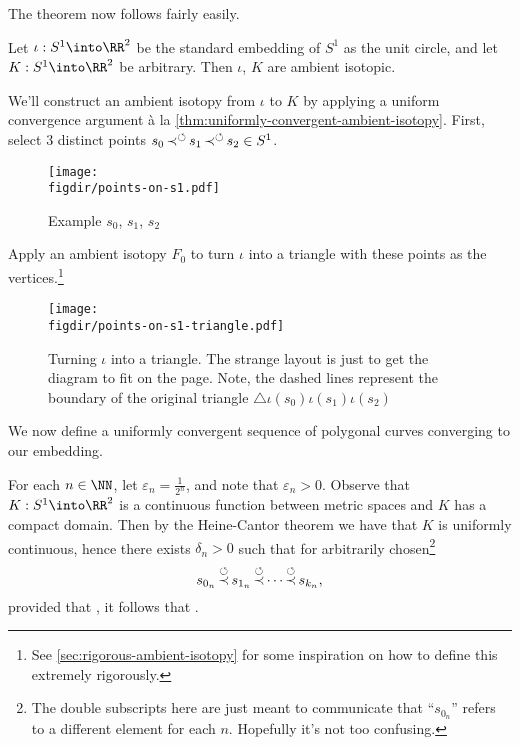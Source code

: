 The theorem now follows fairly easily.
\begin{theorem}\label{thm:all-ambient-isotopic-in-r2}
  Let $\iota : S^1 \into \RR^2$ be the standard embedding of $S^1$ as
  the unit circle, and let $K : S^1 \into \RR^2$ be arbitrary. Then
  $\iota$, $K$ are ambient isotopic.
\end{theorem}
\begin{sproof}
  We'll construct an ambient isotopy from $\iota$ to $K$ by applying a
  uniform convergence argument \`{a} la
  \cref{thm:uniformly-convergent-ambient-isotopy}. First, select $3$
  distinct points $s_{0}\operatorname{\operatorname*{\prec}^{\circlearrowleft}} s_{1} \operatorname{\operatorname*{\prec}^{\circlearrowleft}} s_{2} \in S^1$.
  \begin{figure}[H]
    \centering
    \texttt{[image: \\figdir/points-on-s1.pdf]}
    \caption{Example $s_{0}$, $s_{1}$, $s_{2}$}
  \end{figure}
  Apply an ambient isotopy $F_0$ to turn $\iota$ into a triangle with
  these points as the vertices.\footnote{See
    \cref{sec:rigorous-ambient-isotopy} for some inspiration on how to
    define this extremely rigorously.}
  \begin{figure}[H]
    \centering
    \texttt{[image: \\figdir/points-on-s1-triangle.pdf]}
    \caption{Turning $\iota$ into a triangle. The strange layout is
      just to get the diagram to fit on the page. Note, the dashed
      lines represent the boundary of the original triangle $\triangle
      \iota(s_{0}) \iota(s_{1}) \iota(s_{2})$}
  \end{figure}
  We now define a uniformly convergent sequence of polygonal curves
  converging to our embedding.

  For each $n \in \NN$, let $\varepsilon_n = \frac{1}{2^n}$, and note
  that $\varepsilon_n > 0$. Observe that $K : S^1 \into \RR^2$ is a
  continuous function between metric spaces and $K$ has a compact
  domain. Then by the Heine-Cantor theorem we have that $K$ is
  uniformly continuous, hence there exists $\delta_n > 0$ such that
  for arbitrarily chosen\footnote{The double subscripts here are just
    meant to communicate that ``$s_{0_n}$'' refers to a different
    element for each $n$. Hopefully it's not too confusing.}
  \[
    s_{0_n} \operatorname{\operatorname*{\prec}^{\circlearrowleft}} s_{1_n} \operatorname{\operatorname*{\prec}^{\circlearrowleft}} \cdots \operatorname{\operatorname*{\prec}^{\circlearrowleft}} s_{k_n},
  \]
  provided that , it follows that .


\end{sproof}
